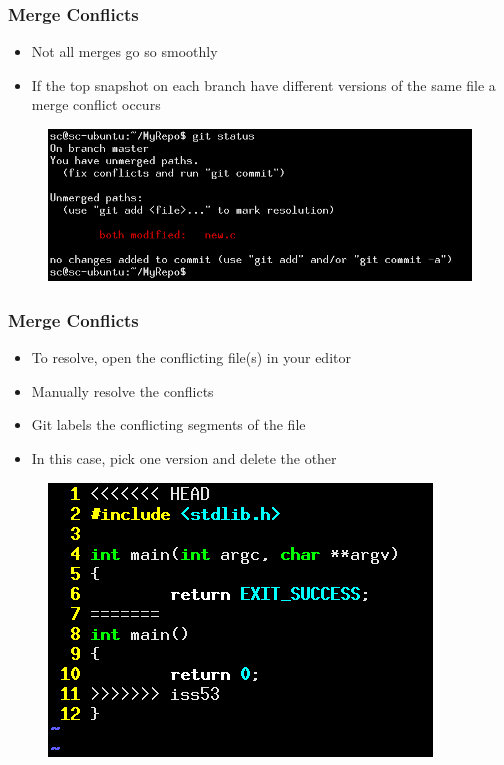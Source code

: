\documentclass{beamer}
\begin{document}
\begin{frame}
	\frametitle{Merge Conflicts}
	\begin{itemize}
		\item{Not all merges go so smoothly}
		\item{If the top snapshot on each branch have different versions of the same file a merge conflict occurs}
	\end{itemize}
	\begin{figure}
		\includegraphics[scale=0.38]{Merging_Branches-10.png}
	\end{figure}
\end{frame}

\begin{frame}
	\frametitle{Merge Conflicts}
	\begin{itemize}
		\item{To resolve, open the conflicting file(s) in your editor}
		\item{Manually resolve the conflicts}
		\item{Git labels the conflicting segments of the file}
		\item{In this case, pick one version and delete the other}
	\end{itemize}
	\begin{figure}
		\includegraphics[scale=0.4]{Merging_Branches-11.png}
	\end{figure}
\end{frame}
\end{document}
